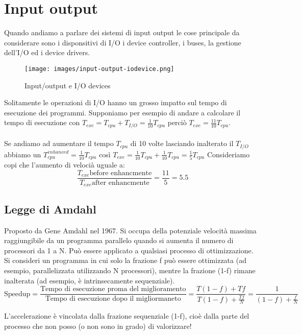 \section{Input output}
Quando andiamo a parlare dei sistemi di input output le cose principale da considerare sono i 
disponsitivi di I/O i device controller, i buses, la gestione dell'I/O ed i device drivers.

\begin{figure}[!h]
    \centering
    \texttt{[image: images/input-output-iodevice.png]}
    \caption{Input/output e I/O devices}
\end{figure}

\hspace{-15pt}Solitamente le operazioni di I/O hanno un grosso impatto sul tempo di esecuzione dei programmi.
Supponiamo per esempio di andare a calcolare il tempo di esecuzione con \(T_{exe} = T_{cpu} + T_{I/O} = \frac{1}{10}T_{cpu}\) perciò
\(T_{exe} = \frac{11}{10}T_{cpu}\).\\\\
\hspace{-15pt}Se andiamo ad aumentare il tempo \(T_{cpu}\) di 10 volte lasciando inalterato il \(T_{I/O}\) abbiamo
un \(T_{cpu}^{enhanced} = \frac{1}{10} T_{cpu}\) così \(T_{exe} = \frac{1}{10}T_{cpu} + \frac{1}{10}T_{cpu} = \frac{1}{5}T_{cpu}\)
Consideriamo copi che l'aumento di velocià uguale a: \[\frac{T_{exe} \text{before enhancmente}}{T_{exe} \text{after enhancmente}} = \frac{11}{5} = 5.5\]

\subsection{Legge di Amdahl}
Proposto da Gene Amdahl nel 1967. Si occupa della potenziale velocità massima raggiungibile da un programma parallelo quando si aumenta il numero di processori da 1 a N.
Può essere applicato a qualsiasi processo di ottimizzazione. 
Si consideri un programma in cui solo la frazione f può essere ottimizzata (ad esempio, parallelizzata utilizzando N processori), mentre la frazione (1-f) rimane inalterata (ad esempio, è intrinsecamente sequenziale).
\[\text{Speedup} = \frac{\text{Tempo di esecuzione proma del miglioramento}}{\text{Tempo di esecuzione dopo il migliormaneto}} = \frac{T(1- f) + Tf}{T(1 - f) + \frac{Tf}{N}} = \frac{1}{(1 - f) + \frac{f}{N}}\]

\begin{observation}
    L'accelerazione è vincolata dalla frazione sequenziale (1-f), cioè dalla parte del processo che non posso (o non sono in grado) di valorizzare!
\end{observation}

